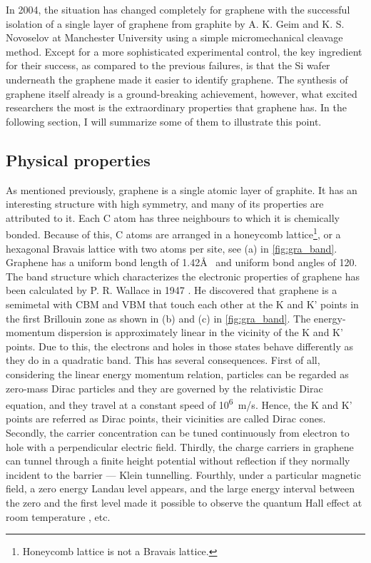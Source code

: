 In 2004, the situation has changed completely for graphene with the successful isolation of a single layer of graphene from graphite by A. K. Geim and K. S. Novoselov at Manchester University using a simple micromechanical cleavage method. Except for a more sophisticated experimental control, the key ingredient for their success, as compared to the previous failures\cite{Krishnan1997,Ohashi1997}, is that the Si wafer underneath the graphene made it easier to identify graphene\cite{Geim2007}. The synthesis of graphene itself already is a ground-breaking achievement, however, what excited researchers the most is the extraordinary properties that graphene has. In the following section, I will summarize some of them to illustrate this point.

\subsection{Physical properties}

As mentioned previously, graphene is a single atomic layer of graphite. It has an interesting structure with high symmetry, and many of its properties are attributed to it. Each C atom has three neighbours to which it is chemically bonded. Because of this, C atoms are arranged in a honeycomb lattice\footnote{Honeycomb lattice is not a Bravais lattice.}, or a hexagonal Bravais lattice with two atoms per site, see (a) in \autoref{fig:gra_band}. Graphene has a uniform bond length of 1.42\AA~ and uniform bond angles of 120\textdegree. The band structure which characterizes the electronic properties of graphene has been calculated by P. R. Wallace in 1947 \cite{Wallace1947}. He discovered that graphene is a semimetal with CBM and VBM that touch each other at the K and K' points in the first Brillouin zone as shown in (b) and (c) in \autoref{fig:gra_band}. The energy-momentum dispersion is approximately linear in the vicinity of the K and K' points. Due to this, the electrons and holes in those states behave differently as they do in a quadratic band. This has several consequences. First of all, considering the linear energy momentum relation, particles can be regarded as zero-mass Dirac particles and they are governed by the relativistic Dirac equation\cite{Novoselov2005}, and they travel at a constant speed of \si{10^6m/s}. Hence, the K and K' points are referred as Dirac points, their vicinities are called Dirac cones. Secondly, the carrier concentration can be tuned continuously from electron to hole with a perpendicular electric field\cite{Geim2007}. Thirdly, the charge carriers in graphene can tunnel through a finite height potential without reflection if they normally incident to the barrier — Klein tunnelling\cite{Katsnelson2006}. Fourthly, under a particular magnetic field, a zero energy Landau level appears, and the large energy interval between the zero and the first level made it possible to observe the quantum Hall effect at room temperature \cite{Novoselov1379}, etc.

